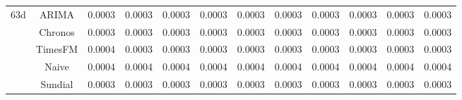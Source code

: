 \begin{table}[H]
{\begin{tabular}{cccccccccccc}
\midrule
\multirow[c]{5}{*}{63d} & ARIMA & 0.0003 & 0.0003 & 0.0003 & 0.0003 & 0.0003 & 0.0003 & 0.0003 & 0.0003 & 0.0003 & 0.0003 \\
 & Chronos & 0.0003 & 0.0003 & 0.0003 & 0.0003 & 0.0003 & 0.0003 & 0.0003 & 0.0003 & 0.0003 & 0.0003 \\
 & TimesFM & 0.0004 & 0.0003 & 0.0003 & 0.0003 & 0.0003 & 0.0003 & 0.0003 & 0.0003 & 0.0003 & 0.0003 \\
 & Naive & 0.0004 & 0.0004 & 0.0004 & 0.0004 & 0.0004 & 0.0004 & 0.0004 & 0.0004 & 0.0004 & 0.0004 \\
 & Sundial & 0.0003 & 0.0003 & 0.0003 & 0.0003 & 0.0003 & 0.0003 & 0.0003 & 0.0003 & 0.0003 & 0.0003 \\
\bottomrule
\end{tabular}

 }
\end{table}
